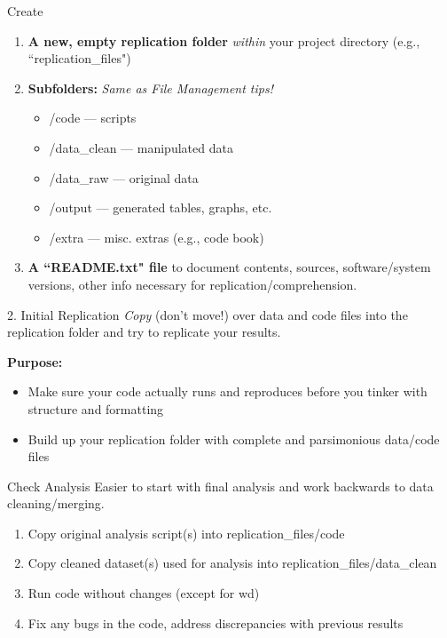 \documentclass[12pt, compress]{beamer} %
\renewcommand{\texttt}[2][ceruleanblue]{\textcolor{#1}{\ttfamily #2}}%
\let\noteitem\item %
\renewcommand{\item}{ 
	\noteitem\vspace{\fill}
	}
\begin{document}
		 \begin{frame}{Create}
		 	\begin{enumerate}
		 		\item \textbf{A new, empty replication folder} \textit{within} your project directory (e.g., ``\texttt{replication\_files}") 
		 		\item \textbf{Subfolders:} \textit{Same as File Management tips!}
		 			\begin{itemize}
		 				\item \texttt{/code} --- scripts
		 				\item \texttt{/data\_clean} --- manipulated data
		 				\item \texttt{/data\_raw} --- original data
		 				\item \texttt{/output} --- generated tables, graphs, etc.
		 				\item \texttt{/extra} --- misc. extras (e.g., code book)
		 			\end{itemize}
		 			\item \textbf{A ``README.txt" file} to document contents, sources, software/system versions, other info necessary for replication/comprehension.
		 	\end{enumerate}
		 \end{frame}
		
		 \begin{frame}{2. Initial Replication}
		 	\textit{Copy} (don't move!) over data and code files into the replication folder and try to replicate your results.
		 	
		 	\bigskip
		 	
		 	\textbf{Purpose:}
			 	\begin{itemize}
			 		\item Make sure your code actually runs and \textcolor{burntorange}{reproduces} before you tinker with structure and formatting
			 		\item Build up your replication folder with \textcolor{burntorange}{complete and parsimonious} data/code files
			 	\end{itemize}
		 \end{frame}
		 
		\begin{frame}{Check Analysis}
			Easier to start with final analysis and work backwards to data cleaning/merging. 
			\begin{enumerate}
				\item Copy original analysis script(s) into \texttt{replication\_files/code}
				\item Copy cleaned dataset(s) used for analysis into \texttt{replication\_files/data\_clean}
				\item Run code without changes (except for wd)
				\item Fix any bugs in the code, address discrepancies with previous results
			\end{enumerate}
		\end{frame}
		
\end{document}
